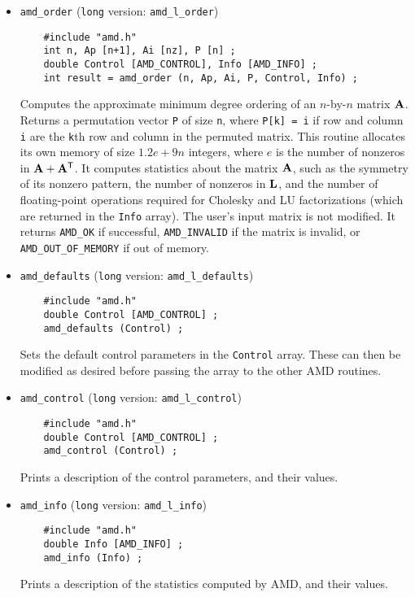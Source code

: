 \documentclass[11pt]{article}
\newcommand{\m}[1]{{\bf{#1}}}       %
\newcommand{\tr}{^{\sf T}}          %
\begin{document}
\begin{itemize}
\item {\tt amd\_order}
({\tt long} version: {\tt amd\_l\_order})
    {\footnotesize
    \begin{verbatim}
    #include "amd.h"
    int n, Ap [n+1], Ai [nz], P [n] ;
    double Control [AMD_CONTROL], Info [AMD_INFO] ;
    int result = amd_order (n, Ap, Ai, P, Control, Info) ;
    \end{verbatim}
    }
    Computes the approximate minimum degree ordering of an $n$-by-$n$ matrix
    $\m{A}$.  Returns a permutation vector {\tt P} of size {\tt n}, where
    {\tt P[k] = i} if row and column {\tt i} are the {\tt k}th row and
    column in the permuted matrix.
    This routine allocates its own memory of size $1.2e+9n$ integers,
    where $e$ is the number of nonzeros in $\m{A}+\m{A}\tr$.
    It computes statistics about the matrix $\m{A}$, such as the symmetry of
    its nonzero pattern, the number of nonzeros in $\m{L}$,
    and the number of floating-point operations required for Cholesky and LU
    factorizations (which are returned in the {\tt Info} array).
    The user's input matrix is not modified.
    It returns {\tt AMD\_OK} if successful, {\tt AMD\_INVALID} if
    the matrix is invalid, or {\tt AMD\_OUT\_OF\_MEMORY} if out of memory.

\item {\tt amd\_defaults}
({\tt long} version: {\tt amd\_l\_defaults})
    {\footnotesize
    \begin{verbatim}
    #include "amd.h"
    double Control [AMD_CONTROL] ;
    amd_defaults (Control) ;
    \end{verbatim}
    }
    Sets the default control parameters in the {\tt Control} array.  These can
    then be modified as desired before passing the array to the other AMD
    routines.

\item {\tt amd\_control}
({\tt long} version: {\tt amd\_l\_control})
    {\footnotesize
    \begin{verbatim}
    #include "amd.h"
    double Control [AMD_CONTROL] ;
    amd_control (Control) ;
    \end{verbatim}
    }
    Prints a description of the control parameters, and their values.

\item {\tt amd\_info}
({\tt long} version: {\tt amd\_l\_info})
    {\footnotesize
    \begin{verbatim}
    #include "amd.h"
    double Info [AMD_INFO] ;
    amd_info (Info) ;
    \end{verbatim}
    }
    Prints a description of the statistics computed by AMD, and their values.


\end{itemize}
\end{document}
